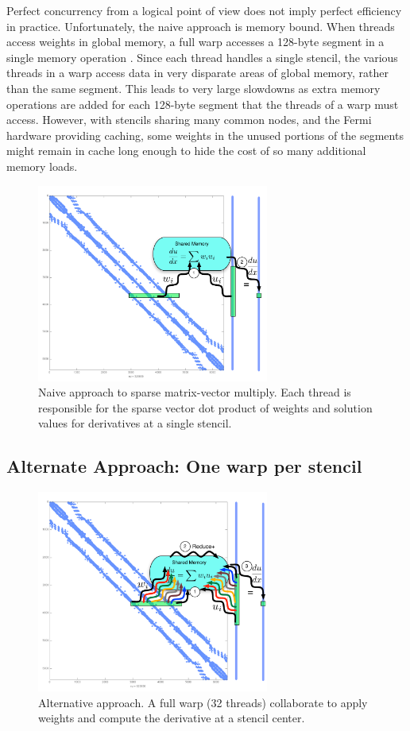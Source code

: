\documentclass{report}
\begin{document}
Perfect concurrency from a logical point of view does not 
imply perfect efficiency in practice. 
Unfortunately, the naive approach 
is memory bound. When threads access weights in global memory, 
a full warp accesses a 128-byte segment in a single memory operation \cite{CudaGuide2011}.
Since each thread handles a single stencil, the various threads in a warp access data in very disparate areas of global memory, rather than the same segment. This leads to very large slowdowns as extra memory operations are added for each 128-byte segment that the threads of a warp must access.
However, with stencils sharing many common nodes, and the Fermi hardware providing caching, some weights in the unused portions of the segments might remain in cache long enough to hide the cost of so many additional memory loads. 



\begin{figure}[htbp]
      \centering
       \includegraphics[width=3in]{../figures/paper1/figures/omnigraffle/oneThreadPerStencil.pdf}
      \caption{Naive approach to sparse matrix-vector multiply. Each thread is responsible for the sparse vector dot product of weights and solution values for derivatives at a single stencil.  }
      \label{fig:oneThreadPerStencil}
\end{figure}


\subsection{Alternate Approach: One warp per stencil} 

\begin{figure}[htbp]
      \centering
       \includegraphics[width=3in]{../figures/paper1/figures/omnigraffle/oneWarpPerStencil.pdf}
      \caption{Alternative approach. A full warp (32 threads) collaborate to apply weights  and compute the derivative at a stencil center. }
      \label{fig:oneWarpPerStencil}
\end{figure}
\end{document}
